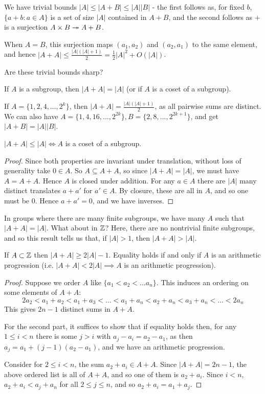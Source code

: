 \documentclass[10pt,a4paper]{article}
\begin{document}
We have trivial bounds $|A|\leq |A+B| \leq |A||B|$ - the first follows as, for fixed $b$, $\{a+b:a \in A\}$ is a set of size $|A|$ contained in $A+B$, and the second follows as $+$ is a surjection $A \times B \twoheadrightarrow A+B$.

When $A=B$, this surjection maps $(a_1, a_2)$ and $(a_2,a_1)$ to the same element, and hence $|A+A| \leq \frac{|A|(|A|+1)}{2} = \frac{1}{2}|A|^2 + O(|A|)$.

Are these trivial bounds sharp?

If $A$ is a subgroup, then $|A+A| = |A|$ (or if $A$ is a coset of a subgroup).

If $A = \{1,2,4,\ldots, 2^k\}$, then $|A+A| = \frac{|A|(|A|+1)}{2}$, as all pairwise sums are distinct. We can also have $A = \{1,4,16,\ldots, 2^{2k}\}, B = \{2,8,\ldots,2^{2k+1}\}$, and get $|A+B| = |A||B|$.
\begin{lemma}
  $|A+A| \leq |A| \iff A$ is a coset of a subgroup.
\end{lemma}
\begin{proof}
  Since both properties are invariant under translation, without loss of generality take $0 \in A$. So $A \subseteq A+A$, so since $|A+A| = |A|$, we must have $A = A+A$. Hence $A$ is closed under addition. For any $a \in A$ there are $|A|$ many distinct translates $a+a'$ for $a' \in A$. By closure, these are all in $A$, and so one must be $0$. Hence $a+a' = 0$, and we have inverses.
\end{proof}
In groups where there are many finite subgroups, we have many $A$ such that $|A+A| = |A|$. What about in $\mathbb{Z}$? Here, there are no nontrivial finite subgroups, and so this result tells us that, if $|A|>1$, then $|A+A| > |A|$.
\begin{lemma}
  If $A \subset \mathbb{Z}$ then $|A+A| \geq 2|A|-1$. Equality holds if and only if $A$ is an arithmetic progression (i.e. $|A+A| < 2|A| \implies A$ is an arithmetic progression).
\end{lemma}
\begin{proof}
  Suppose we order $A$ like $\{a_1 < a_2 < \ldots a_n\}$. This induces an ordering on some elements of $A+A$:
  \[2a_2 < a_1+a_2 < a_1+a_3 < \ldots < a_1+a_n < a_2 + a_n < a_3 + a_n < \ldots < 2a_n\]
  This gives $2n-1$ distinct sums in $A+A$.

  For the second part, it suffices to show that if equality holds then, for any $1 \leq i < n$ there is some $j > i$ with $a_j - a_i = a_2-a_1$, as then $a_j = a_1 + (j-1)(a_2-a_1)$, and we have an arithmetic progression.

  Consider for $2 \leq i < n$, the sum $a_2 + a_i \in A+A$. Since $|A+A| = 2n-1$, the above ordered list is all of $A+A$, and so one of them is $a_2+a_i$. Since $i< n$, $a_2 + a_i < a_j + a_n$ for all $2 \leq j \leq n$, and so $a_2 + a_i = a_1 + a_j$.
\end{proof}
\end{document}
